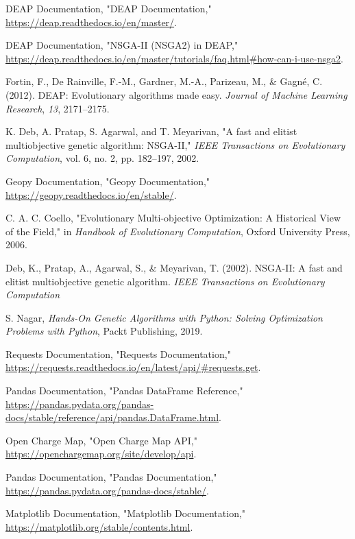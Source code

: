 \begin{thebibliography}{99}
     DEAP Documentation, "DEAP Documentation," \url{https://deap.readthedocs.io/en/master/}.
    
     DEAP Documentation, "NSGA-II (NSGA2) in DEAP," \url{https://deap.readthedocs.io/en/master/tutorials/faq.html\#how-can-i-use-nsga2}.

    Fortin, F., De Rainville, F.-M., Gardner, M.-A., Parizeau, M., \& Gagné, C. (2012). DEAP: Evolutionary algorithms made easy. \textit{Journal of Machine Learning Research}, \textit{13}, 2171--2175.

    
     K. Deb, A. Pratap, S. Agarwal, and T. Meyarivan, "A fast and elitist multiobjective genetic algorithm: NSGA-II," \textit{IEEE Transactions on Evolutionary Computation}, vol. 6, no. 2, pp. 182–197, 2002.
    
     Geopy Documentation, "Geopy Documentation," \url{https://geopy.readthedocs.io/en/stable/}.
    
     C. A. C. Coello, "Evolutionary Multi-objective Optimization: A Historical View of the Field," in \textit{Handbook of Evolutionary Computation}, Oxford University Press, 2006.

     Deb, K., Pratap, A., Agarwal, S., \& Meyarivan, T. (2002). NSGA-II: A fast and elitist multiobjective genetic algorithm. \textit{IEEE Transactions on Evolutionary Computation}

    
     S. Nagar, \textit{Hands-On Genetic Algorithms with Python: Solving Optimization Problems with Python}, Packt Publishing, 2019.

     Requests Documentation, "Requests Documentation,"  \url{https://requests.readthedocs.io/en/latest/api/\#requests.get}.
    
     Pandas Documentation, "Pandas DataFrame Reference," \url{https://pandas.pydata.org/pandas-docs/stable/reference/api/pandas.DataFrame.html}.



    
     Open Charge Map, "Open Charge Map API," \url{https://openchargemap.org/site/develop/api}.
    


     Pandas Documentation, "Pandas Documentation," \url{https://pandas.pydata.org/pandas-docs/stable/}.
    
    Matplotlib Documentation, "Matplotlib Documentation," \url{https://matplotlib.org/stable/contents.html}.
    

       

\end{thebibliography}
